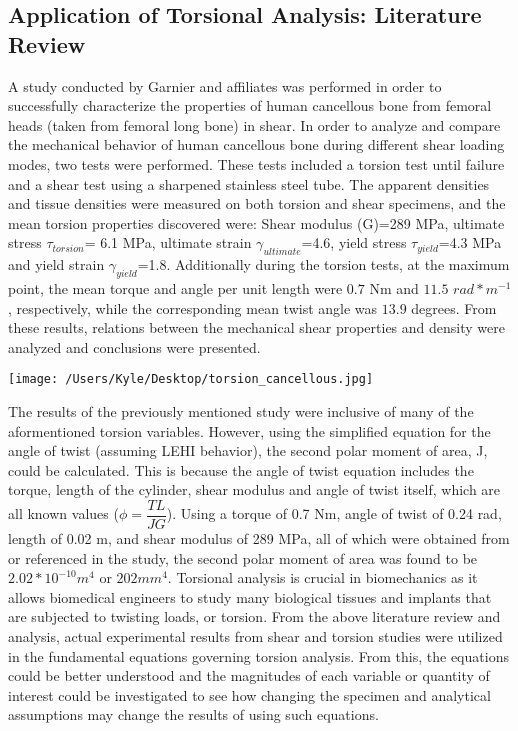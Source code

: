 \documentclass[12pt]{article}
\begin{document}
\subsection*{Application of Torsional Analysis: Literature Review}
A study conducted by Garnier and affiliates was performed in order to successfully characterize the properties of human cancellous bone from femoral heads (taken from femoral long bone) in shear. In order to analyze and compare the mechanical behavior of human cancellous bone during different shear loading modes, two tests were performed. These tests included a torsion test until failure and a shear test using a sharpened stainless steel tube. The apparent densities and tissue densities were measured on both torsion and shear specimens, and the mean torsion properties discovered were: Shear modulus (G)=289 MPa, ultimate stress $\tau_{torsion}$= 6.1 MPa, ultimate strain $\gamma_{ultimate}$=4.6, yield stress $\tau_{yield}$=4.3 MPa and yield strain $\gamma_{yield}$=1.8. Additionally during the torsion tests, at the maximum point, the mean torque and angle per unit length were $0.7$ Nm and $11.5$ $rad*m^{-1}$, respectively, while the corresponding mean twist angle was $13.9$ degrees. From these results, relations between the mechanical shear properties and density were analyzed and conclusions were presented.
\begin{center}
   \texttt{[image: /Users/Kyle/Desktop/torsion\_cancellous.jpg]}
\end{center}

The results of the previously mentioned study were inclusive of many of the aformentioned torsion variables. However, using the simplified equation for the angle of twist (assuming LEHI behavior), the second polar moment of area, J, could be calculated. This is because the angle of twist equation includes the torque, length of the cylinder, shear modulus and angle of twist itself, which are all known values ($\phi=\dfrac{TL}{JG}$). Using a torque of 0.7 Nm, angle of twist of 0.24 rad, length of 0.02 m, and shear modulus of 289 MPa, all of which were obtained from or referenced in the study, the second polar moment of area was found to be $2.02*10^{-10} m^{4}$ or $202 mm^{4}$. 
Torsional analysis is crucial in biomechanics as it allows biomedical engineers to study many biological tissues and implants that are subjected to twisting loads, or torsion. From the above literature review and analysis, actual experimental results from shear and torsion studies were utilized in the fundamental equations governing torsion analysis. From this, the equations could be better understood and the magnitudes of each variable or quantity of interest could be investigated to see how changing the specimen and analytical assumptions may change the results of using such equations.
 \vspace{1cm}
%
%
\end{document}
